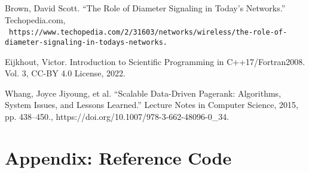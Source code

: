 \documentclass{article}
\begin{document}
\begin{enumerate}[label={[\arabic*]}]
  \item Brown, David Scott. “The Role of Diameter Signaling in Today's Networks.” Techopedia.com, \
\nolinkurl{https://www.techopedia.com/2/31603/networks/wireless/the-role-of-diameter-signaling-in-todays-networks.}
  \item Eijkhout, Victor. Introduction to Scientific Programming in C++17/Fortran2008. Vol. 3, CC-BY 4.0 License, 2022.
  \item Whang, Joyce Jiyoung, et al. “Scalable Data-Driven Pagerank: Algorithms, System Issues, and Lessons Learned.” Lecture Notes in Computer Science, 2015, pp. 438–450., https://doi.org/10.1007/978-3-662-48096-0\_34. 

\end{enumerate}



\pagebreak
\section{Appendix: Reference Code}
\end{document}

